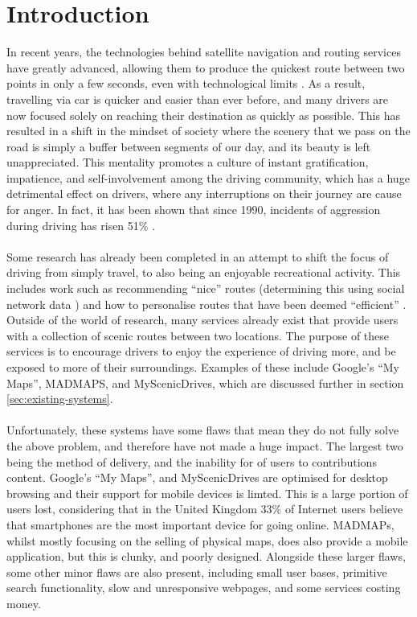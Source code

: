 \section{Introduction}
\label{sec:intro}
In recent years, the technologies behind satellite navigation and routing services have greatly advanced, allowing them to produce the quickest route between two points in only a few seconds, even with technological limits \cite{lou2009map}. As a result, travelling via car is quicker and easier than ever before, and many drivers are now focused solely on reaching their destination as quickly as possible. This has resulted in a shift in the mindset of society where the scenery that we pass on the road is simply a buffer between segments of our day, and its beauty is left unappreciated. This mentality promotes a culture of instant gratification, impatience, and self-involvement among the driving community, which has a huge detrimental effect on drivers, where any interruptions on their journey are cause for anger. In fact, it has been shown that since 1990, incidents of aggression during driving has risen 51\% \cite{vest1997road}. \ \\
\ \\
Some research has already been completed in an attempt to shift the focus of driving from simply travel, to also being an enjoyable recreational activity. This includes work such as recommending ``nice'' routes (determining this using social network data \cite{peregrino2012mapping}\cite{van2011time}\cite{quercia2014shortest}) and how to personalise routes that have been deemed ``efficient'' \cite{chen2011discovering}. Outside of the world of research, many services already exist that provide users with a collection of scenic routes between two locations. The purpose of these services is to encourage drivers to enjoy the experience of driving more, and be exposed to more of their surroundings. Examples of these include Google's ``My Maps''\cite{url2015gmaps}, MADMAPS\cite{url2015madmaps}, and MyScenicDrives\cite{url2015myscenicdrives}, which are discussed further in section \ref{sec:existing-systems}.\ \\
\ \\
Unfortunately, these systems have some flaws that mean they do not fully solve the above problem, and therefore have not made a huge impact. The largest two being the method of delivery, and the inability for of users to contributions content. Google's ``My Maps'', and MyScenicDrives are optimised for desktop browsing and their support for mobile devices is limted. This is a large portion of users lost, considering that in the United Kingdom 33\% of Internet users believe that smartphones are the most important device for going online\cite{ofcom2015comms}. MADMAPs, whilst mostly focusing on the selling of physical maps, does also provide a mobile application, but this is clunky, and poorly designed. Alongside these larger flaws, some other minor flaws are also present, including small user bases, primitive search functionality, slow and unresponsive webpages, and some services costing money.\ \\
